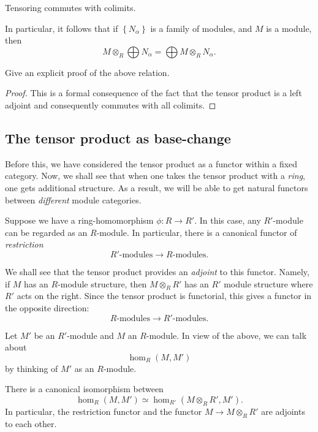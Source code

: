 \begin{proposition}
Tensoring commutes with colimits. 
\end{proposition}

In particular, it follows that if $\left\{N_\alpha\right\}$ is a family of
modules, and $M$ is a module, then
\[ M \otimes_R \bigoplus N_\alpha = \bigoplus M \otimes_R N_\alpha.  \]
\begin{exercise}
Give an explicit proof of the above relation.
\end{exercise}

\begin{proof}
This is a formal consequence of the fact that the tensor product is a left
adjoint and consequently commutes with all colimits.
\end{proof}

\subsection{The tensor product as base-change}

Before this, we have considered the tensor product as a functor within a
fixed category. Now, we shall see that when one takes the tensor product with a
\emph{ring}, one gets additional structure. As a result, we will be able to
get natural functors between  \emph{different} module categories.

Suppose we have a
ring-homomorphism $\phi:R \to R'$.  In this case, any $R'$-module can be
regarded as
an $R$-module.
In particular, there is a canonical functor of \emph{restriction}
\[ R'\mbox{-}\mathrm{modules} \to R\mbox{-}\mathrm{modules}.  \]

We shall see that the tensor product provides an \emph{adjoint} to this
functor.
Namely, if $M$ has an $R$-module
structure, then $M \otimes_R R'$ has an $R'$ module structure where $R'$ acts
on the right. Since the tensor product is functorial, this gives a functor
in the opposite direction:
\[ R\mbox{-}\mathrm{modules} \to R'\mbox{-}\mathrm{modules}.  \]


Let $M'$ be an $R'$-module and $M$ an $R$-module. In view of the above,
we can talk about
\[ \hom_R(M, M')  \]
by thinking of $M'$ as an $R$-module.

\begin{proposition}
There is a canonical isomorphism between
\[ \hom_R(M, M') \simeq \hom_{R'}(M \otimes_R R', M').  \]
In particular, the restriction functor and the functor $M \to M \otimes_R R'$
are adjoints to each other.
\end{proposition}



